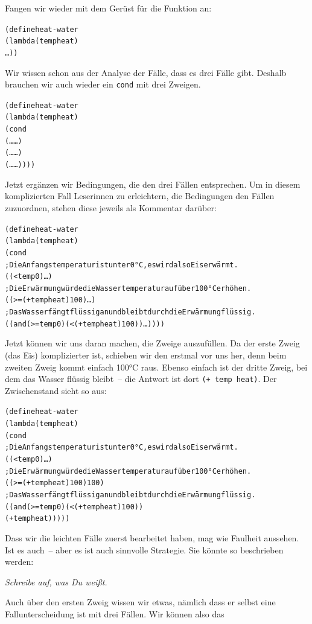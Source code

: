 Fangen wir wieder mit dem Gerüst für die Funktion an:
%
\begin{alltt}
(define heat-water
  (lambda (temp heat)
    \ldots))
\end{alltt}
%
Wir wissen schon aus der Analyse der Fälle, dass es drei Fälle gibt.
Deshalb brauchen wir auch wieder ein \texttt{cond} mit drei Zweigen.
%
\begin{alltt}
(define heat-water
  (lambda (temp heat)
    (cond
      (\ldots{} \ldots)
      (\ldots{} \ldots)
      (\ldots{} \ldots))))
\end{alltt}
%
Jetzt ergänzen wir Bedingungen, die den drei Fällen entsprechen.  Um
in diesem komplizierten Fall Leserinnen zu erleichtern, die
Bedingungen den Fällen zuzuordnen, stehen diese jeweils als Kommentar darüber:
%
\begin{alltt}
(define heat-water
  (lambda (temp heat)
    (cond
      ; Die Anfangstemperatur ist unter 0°C, es wird also Eis erwärmt.
      ((< temp 0) \ldots)
      ; Die Erwärmung würde die Wassertemperatur auf über 100°C erhöhen.
      ((>= (+ temp heat) 100) \ldots)
      ; Das Wasser fängt flüssig an und bleibt durch die Erwärmung flüssig.
      ((and (>= temp 0) (< (+ temp heat) 100)) \ldots))))
\end{alltt}
%
Jetzt können wir uns daran machen, die Zweige auszufüllen.  Da der
erste Zweig (das Eis) komplizierter ist, schieben wir den erstmal vor
uns her, denn beim zweiten Zweig kommt einfach 100°C raus.  Ebenso
einfach ist der dritte Zweig, bei dem das Wasser flüssig bleibt~-- die
Antwort ist dort \texttt{(+ temp heat)}.  Der Zwischenstand sieht so
aus:
%
\begin{alltt}
(define heat-water
  (lambda (temp heat)
    (cond
      ; Die Anfangstemperatur ist unter 0°C, es wird also Eis erwärmt.
      ((< temp 0) \ldots)
      ; Die Erwärmung würde die Wassertemperatur auf über 100°C erhöhen.
      ((>= (+ temp heat) 100) 100)
      ; Das Wasser fängt flüssig an und bleibt durch die Erwärmung flüssig.
      ((and (>= temp 0) (< (+ temp heat) 100))
       (+ temp heat)))))
\end{alltt}
%
Dass wir die leichten Fälle zuerst bearbeitet haben, mag wie Faulheit
aussehen.  Ist es auch~-- aber es ist auch sinnvolle Strategie.  Sie
könnte so beschrieben werden:
%
\begin{center}
  \emph{Schreibe auf, was Du weißt.}
\end{center}
%
Auch über den ersten Zweig wissen wir etwas, nämlich dass er selbst
eine Fallunterscheidung ist mit drei Fällen.  Wir können also das
